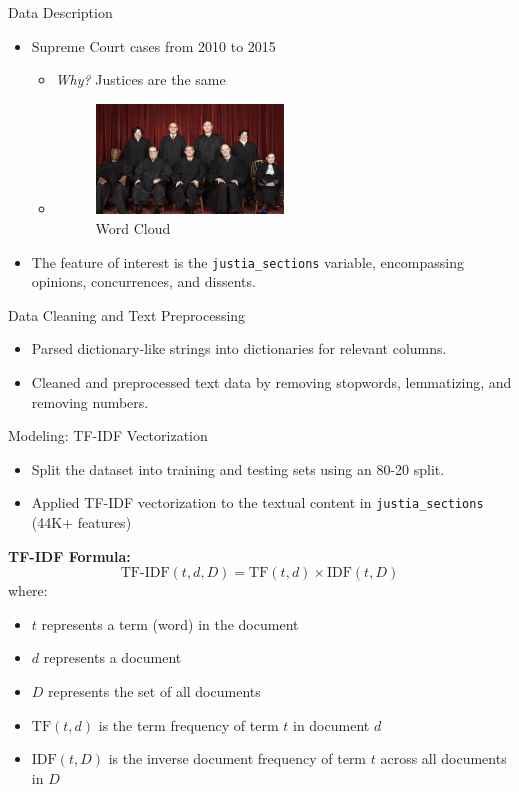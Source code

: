 \documentclass{beamer}
\begin{document}
\begin{frame}{Data Description}
\begin{itemize}
    \item Supreme Court cases from 2010 to 2015
        \begin{itemize}
            \item \textit{Why?} Justices are the same
            \item \begin{figure}
                  \includegraphics[width=0.5\textwidth]{img/roberts_court_2010.jpeg}
                  \caption{ Word Cloud}
                  \end{figure}
        \end{itemize}
    \item The feature of interest is the \texttt{justia\_sections} variable, encompassing opinions, concurrences, and dissents.
\end{itemize}
\end{frame}


\begin{frame}{Data Cleaning and Text Preprocessing}
\begin{itemize}
    \item Parsed dictionary-like strings into dictionaries for relevant columns.
    \item Cleaned and preprocessed text data by removing stopwords, lemmatizing, and removing numbers.
\end{itemize}
\end{frame}


\begin{frame}{Modeling: TF-IDF Vectorization}
\begin{itemize}
    \item Split the dataset into training and testing sets using an 80-20 split.
    \item Applied TF-IDF vectorization to the textual content in \texttt{justia\_sections} (44K+ features)
\end{itemize}

\textbf{TF-IDF Formula:}
\[
\text{TF-IDF}(t, d, D) = \text{TF}(t, d) \times \text{IDF}(t, D)
\]
where:
\begin{itemize}
    \item $t$ represents a term (word) in the document
    \item $d$ represents a document
    \item $D$ represents the set of all documents
    \item $\text{TF}(t, d)$ is the term frequency of term $t$ in document $d$
    \item $\text{IDF}(t, D)$ is the inverse document frequency of term $t$ across all documents in $D$
\end{itemize}
\end{frame}
\end{document}
